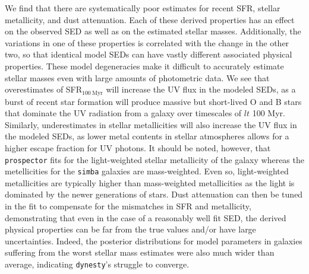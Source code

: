 \documentclass[twocolumn]{aastex62}
\begin{document}
We find that there are systematically poor estimates for recent SFR, stellar metallicity, and dust attenuation. Each of these derived properties has an effect on the observed SED as well as on the estimated stellar masses. Additionally, the variations in one of these properties is correlated with the change in the other two, so that identical model SEDs can have vastly different associated physical properties. These model degeneracies make it difficult to accurately estimate stellar masses even with large amounts of photometric data. We see that overestimates of SFR$_{100 \: \mathrm{Myr}}$ will increase the UV flux in the modeled SEDs, as a burst of recent star formation will produce massive but short-lived O and B stars that dominate the UV radiation from a galaxy over timescales of $lt$ 100 Myr. Similarly, underestimates in stellar metallicities will also increase the UV flux in the modeled SEDs, as lower metal contents in stellar atmospheres allows for a higher escape fraction for UV photons. It should be noted, however, that \texttt{prospector} fits for the light-weighted stellar metallicity of the galaxy whereas the metellicities for the \texttt{simba} galaxies are mass-weighted. Even so, light-weighted metallicities are typically higher than mass-weighted metallicities as the light is dominated by the newer generations of stars. Dust attenuation can then be tuned in the fit to compensate for the mismatches in SFR and metallicity, demonstrating that even in the case of a reasonably well fit SED, the derived physical properties can be far from the true values and/or have large uncertainties. Indeed, the posterior distributions for model parameters in galaxies suffering from the worst stellar mass estimates were also much wider than average, indicating \texttt{dynesty}'s struggle to converge. 
\end{document}
